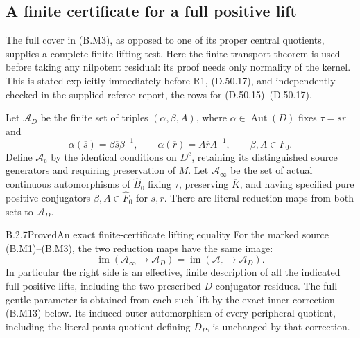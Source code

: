 \subsection{A finite certificate for a full positive lift}

The full cover in (B.M3), as opposed to one of its proper
central quotients, supplies a complete finite lifting test.
Here the finite transport theorem is used before taking
any nilpotent residual: its proof needs only normality of
the kernel.  This is stated explicitly immediately before
R1, (D.50.17), and independently checked in the supplied
referee report, the rows for (D.50.15)--(D.50.17).

Let $\mathcal A_D$ be the finite set of triples
$(\alpha,\beta,A)$, where $\alpha\in\operatorname{Aut}(D)$
fixes $\overline\tau=\overline s\overline r$ and
\[
 \alpha(\overline s)=\beta\overline s\beta^{-1},\qquad
 \alpha(\overline r)=A\overline rA^{-1},\qquad
 \beta,A\in\overline F_0.                       \tag{B.M11}
\]
Define $\mathcal A_{\mathrm c}$ by the identical conditions
on $D^{\mathrm c}$, retaining its distinguished source
generators and requiring preservation of $M$.  Let
$\mathcal A_{\infty}$ be the set of actual continuous
automorphisms of $\widehat B_0$ fixing $\tau$, preserving
$\overline K$, and having specified pure positive
conjugators $\beta,A\in\widehat F_0$ for $s,r$.
There are literal reduction maps from both sets to
$\mathcal A_D$.

\begin{result}{B.2.7}{Proved}{An exact finite-certificate lifting equality}
For the marked source (B.M1)--(B.M3), the two reduction
maps have the same image:
\[
 \operatorname{im}(\mathcal A_{\infty}\longrightarrow
                         \mathcal A_D)
   =\operatorname{im}(\mathcal A_{\mathrm c}\longrightarrow
                         \mathcal A_D).         \tag{B.M12}
\]
In particular the right side is an effective, finite
description of all the indicated full positive lifts,
including the two prescribed $D$-conjugator residues.
The full gentle parameter is obtained from each such
lift by the exact inner correction (B.M13) below.  Its
induced outer automorphism of every peripheral quotient,
including the literal pants quotient defining $D_P$,
is unchanged by that correction.
\end{result}

